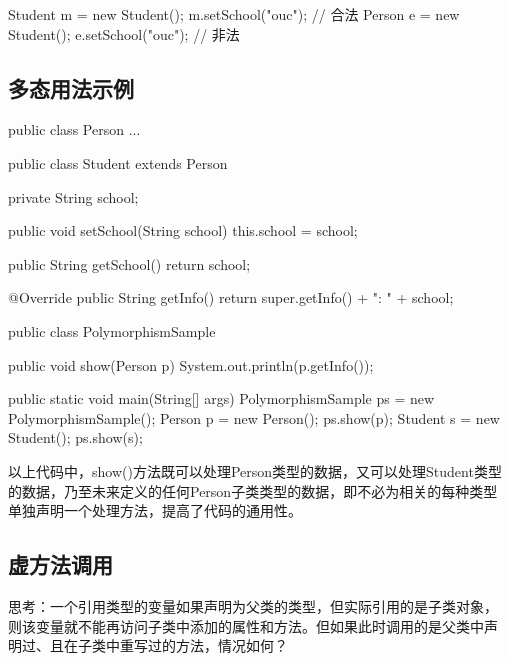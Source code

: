 \begin{javaCode}
  Student m = new Student();
  m.setSchool("ouc"); // 合法
  Person e = new Student();
  e.setSchool("ouc"); // 非法
\end{javaCode}

\subsection{多态用法示例}


\begin{javaCode}
  public class Person {...}
\end{javaCode}


\begin{javaCode}
  public class Student extends Person {
    private String school;

    public void setSchool(String school) {
      this.school = school;
    }

    public String getSchool() {
      return school;
    }

    @Override
    public String getInfo() {
      return super.getInfo() + "\tSchool: " + school;
    }
  }
\end{javaCode}


\begin{javaCode}
  public class PolymorphismSample {
    public void show(Person p) {
      System.out.println(p.getInfo());
    }
    
    public static void main(String[] args) {
      PolymorphismSample ps = new PolymorphismSample();
      Person p = new Person();
      ps.show(p);
      Student s = new Student();
      ps.show(s);
    }
  }
\end{javaCode}


以上代码中，show()方法既可以处理Person类型的数据，又可以处理Student类型
的数据，乃至未来定义的任何Person子类类型的数据，即不必为相关的每种类型
单独声明一个处理方法，提高了代码的通用性。

\subsection{虚方法调用}

思考：一个引用类型的变量如果声明为父类的类型，但实际引用的是子类对象，
则该变量就不能再访问子类中添加的属性和方法。但如果此时调用的是父类中声
明过、且在子类中重写过的方法，情况如何？

